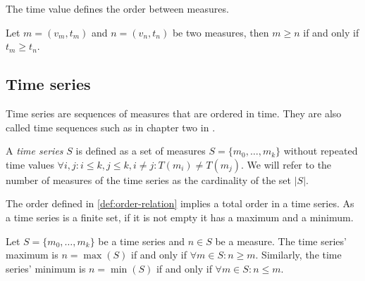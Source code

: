 

The time value defines the order between measures.

\begin{definition}
  \label{def:order-relation}
  Let $m=(v_m,t_m)$ and $n=(v_n,t_n)$ be two measures, then $m\geq n$
  if and only if $t_m\geq t_n$.
\end{definition}

\subsection{Time series}

Time series are sequences of measures that are ordered in time. They
are also called time sequences such as in chapter two in \cite{last}.

\begin{definition}
  A \emph{time series} $S$ is defined as a set of measures
  $S=\{m_0,\ldots,m_k\}$ without repeated time values $\forall i,j:
  i\leq k, j\leq k, i\neq j : T(m_i)\neq T(m_j)$. We will refer to the
  number of measures of the time series as the cardinality of the set
  $|S|$.
\end{definition}

The order defined in \ref{def:order-relation} implies a total order in
a time series. As a time series is a finite set, if it is not empty it
has a maximum and a minimum. 

\begin{definition}
  Let $S=\{m_0,\ldots,m_k\}$ be a time series and $n\in S$ be a
  measure. The time series' maximum is $n=\max(S)$ if and only if
  $\forall m \in S: n \geq m $.  Similarly, the time series' minimum
  is $n=\min(S)$ if and only if $\forall m \in S: n \leq m$.
\end{definition}

